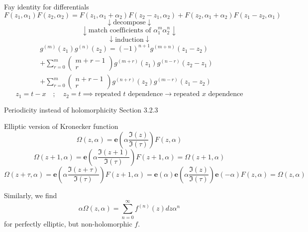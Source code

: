 \documentclass[11pt,aspectratio=169]{beamer}
\newcommand{\ee}[0]{\mathbf{e}}
\begin{document}
\begin{frame}{Fay identity for differentials}
    \[F(z_1,\alpha_1)F(z_2,\alpha_2) = F(z_1,\alpha_1+\alpha_2)F(z_2-z_1,\alpha_2)+F(z_2,\alpha_1+\alpha_2)F(z_1-z_2,\alpha_1)\]
    \[\downarrow \text{decompose} \downarrow\]
    \[\downarrow \text{match coefficients of }\alpha_1^m \alpha_2^n \downarrow\]
    \[\downarrow \text{induction} \downarrow\]
    \begin{align*}
        g^{(m)}(z_1) g^{(n)}(z_2) = (-1)^{n+1} g^{(m+n)}(z_1-z_2)& \\
         +\sum_{r=0}^m \begin{pmatrix} m+r-1 \\ r \end{pmatrix} g^{(m+r)}(z_1) g^{(n-r)}(z_2-z_1) & \\
         +\sum_{r=0}^m \begin{pmatrix} n+r-1 \\ r \end{pmatrix} g^{(n+r)}(z_2) g^{(m-r)}(z_1-z_2) & 
    \end{align*}
    \[z_1 = t-x \quad ; \quad z_2 = t \implies \text{repeated }t\text{ dependence} \rightarrow \text{repeated }x\text{ dependence}\]
\end{frame}

\begin{frame}{Periodicity instead of holomorphicity}{\tiny \cite{Broedel_2015} Section 3.2.3}
    \begin{block}{Elliptic version of Kronecker function}
        \[\Omega(z,\alpha) = \ee\left(\alpha \frac{\Im(z)}{\Im(\tau)}\right) F(z,\alpha)\]
        \vspace{+1em}
        \[\Omega(z+1,\alpha) = \ee\left(\alpha \frac{\Im(z+1)}{\Im(\tau)}\right) F(z+1,\alpha) = \Omega(z+1,\alpha)\]
        \[\Omega(z+\tau,\alpha) = \ee\left(\alpha \frac{\Im(z+\tau)}{\Im(\tau)}\right) F(z+1,\alpha) = \ee(\alpha) \ee\left(\alpha \frac{\Im(z)}{\Im(\tau)}\right) \ee(-\alpha) F(z,\alpha) = \Omega(z,\alpha)\]
    \end{block}
    
    Similarly, we find
    \[ \alpha \Omega(z,\alpha) = \sum_{n=0}^\infty f^{(n)}(z)dz \alpha^n \]
    for perfectly elliptic, but non-holomorphic $f$.

\end{frame}
\end{document}
